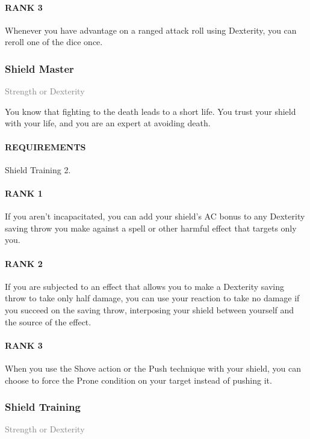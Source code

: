 \paragraph{RANK 3} Whenever you have advantage on a ranged attack roll using Dexterity, you can reroll one of the dice once.

\subsubsection{Shield Master} \label{feat::shieldmaster}
\small{\textcolor{gray}{Strength or Dexterity}}

\normalsize
You know that fighting to the death leads to a short life.
You trust your shield with your life, and you are an expert at avoiding death.
\paragraph{REQUIREMENTS} Shield Training 2.
\paragraph{RANK 1} If you aren't incapacitated, you can add your shield's AC bonus to any Dexterity saving throw you make against a spell or other harmful effect that targets only you.
\paragraph{RANK 2} If you are subjected to an effect that allows you to make a Dexterity saving throw to take only half damage, you can use your reaction to take no damage if you succeed on the saving throw, interposing your shield between yourself and the source of the effect.
\paragraph{RANK 3} When you use the Shove action or the Push technique with your shield, you can choose to force the Prone condition on your target instead of pushing it.

\subsubsection{Shield Training} \label{feat::shieldtraining}
\small{\textcolor{gray}{Strength or Dexterity}}

